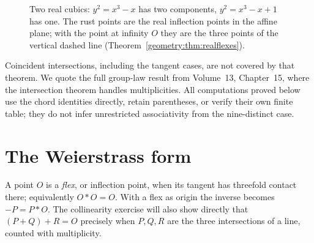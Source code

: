 \begin{figure}[ht]
\centering
{}
\caption{Two real cubics: $y^2=x^3-x$ has two components, $y^2=x^3-x+1$ has one. The rust points are the real inflection points in the affine plane; with
the point at infinity $O$ they are the three points of the vertical dashed line (Theorem~\ref{geometry:thm:realflexes}).}
\label{geometry:fig:realcubics}
\end{figure}

\begin{remark}
Coincident intersections, including the tangent cases, are not covered by that theorem. We quote the full group-law result from Volume~13, Chapter~15, where the intersection theorem handles multiplicities. All computations proved below use the chord identities directly, retain parentheses, or verify their own finite table; they do not infer unrestricted associativity from the nine-distinct case.
\end{remark}

\section{The Weierstrass form}\label{geometry:sec:weierstrass}

A point $O$ is a \emph{flex}, or inflection point, when its tangent has threefold contact there; equivalently $O*O=O$. With a flex as origin the inverse becomes $-P=P*O$. The collinearity exercise will also show directly that $(P+Q)+R=O$ precisely when $P,Q,R$ are the three intersections of a line, counted with multiplicity.

